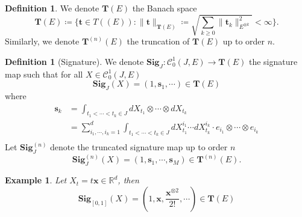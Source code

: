 \documentclass[12pt]{report}
\newtheorem{example}[theorem]{Example}
\theoremstyle{definition}
\newtheorem{definition}[theorem]{Definition}
\theoremstyle{remark}
\newcommand{\R}{\mathbb{R}}
\begin{document}
\begin{definition}
  We denote $\mathbf{T}(E)$ the Banach space 
  \begin{equation}
    \mathbf{T}(E) \coloneq \bigg\{\mathbf{t} \in T((E)) \colon \lVert \mathbf{t}\rVert_{\mathbf{T}(E)} \coloneq \sqrt{\sum_{k\geq 0}\lVert \mathbf{t}_{k}\rVert_{E^{\otimes k}}^{2} } < \infty \bigg\}.
  \end{equation} 
  Similarly, we denote $\mathbf{T}^{(n)}(E)$ the truncation of $\mathbf{T}(E)$ up to order $n$.
\end{definition}

\begin{definition}[Signature]
  We denote $\mathbf{Sig}_{J} \colon \mathcal{C}^{1}_{0}(J,E) \to \mathbf{T}(E)$ the signature map such that for all $X \in \mathcal{C}^{1}_{0}(J,E)$
  \begin{equation}
    \mathbf{Sig}_{J}(X) = (1, \mathbf{s}_{1},\cdots) \in \mathbf{T}(E)
  \end{equation}
  where 
  \begin{equation}
    \begin{split}
      \mathbf{s}_{k} &= \int_{t_{1}<\cdots< t_{k} \in J}dX_{t_{1}}\otimes\cdots\otimes dX_{t_{k}}\\
      &= \sum_{i_{1},\cdots,i_{k} = 1}^{d} \int_{t_{1}<\cdots< t_{k} \in J}dX_{t_{1}}^{i_{1}}\cdots dX_{t_{k}}^{i_{k}} \cdot e_{i_{1}}\otimes\cdots\otimes e_{i_{k}} \\
    \end{split}
  \end{equation}
  Let $\mathbf{Sig}^{(n)}_{J}$ denote the truncated signature map up to order $n$
  \begin{equation}
    \mathbf{Sig}^{(n)}_{J}(X) = (1, \mathbf{s}_{1},\cdots, \mathbf{s}_{M}) \in \mathbf{T}^{(n)}(E).
  \end{equation}
\end{definition}
\begin{example}\label{linear}
  Let $X_{t} = t\mathbf{x} \in \R^{d}$, then 
  \begin{equation}
    \mathbf{Sig}_{[0,1]}(X) = (1, \mathbf{x},\frac{\mathbf{x}^{\otimes 2}}{2!}, \cdots) \in \mathbf{T}(E)
  \end{equation}
\end{example}
\end{document}
